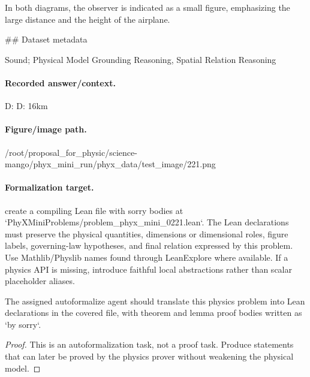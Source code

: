 In both diagrams, the observer is indicated as a small figure, emphasizing the large distance and the height of the airplane.

\#\# Dataset metadata

Sound; Physical Model Grounding Reasoning, Spatial Relation Reasoning

\paragraph{Recorded answer/context.}
D: D: 16km

\paragraph{Figure/image path.}
/root/proposal\_for\_physic/science-mango/phyx\_mini\_run/phyx\_data/test\_image/221.png

\paragraph{Formalization target.}
create a compiling Lean file with sorry bodies at `PhyXMiniProblems/problem\_phyx\_mini\_0221.lean`. The Lean declarations must preserve the physical quantities, dimensions or dimensional roles, figure labels, governing-law hypotheses, and final relation expressed by this problem.
Use Mathlib/Physlib names found through LeanExplore where available. If a physics API is missing, introduce faithful local abstractions rather than scalar placeholder aliases.

\begin{theorem}
\label{thm:physics:phyx_mini_0221:target}
The assigned autoformalize agent should translate this physics problem into Lean declarations in the covered file, with theorem and lemma proof bodies written as `by sorry`.
\end{theorem}
\begin{proof}
This is an autoformalization task, not a proof task. Produce statements that can later be proved by the physics prover without weakening the physical model.
\end{proof}

